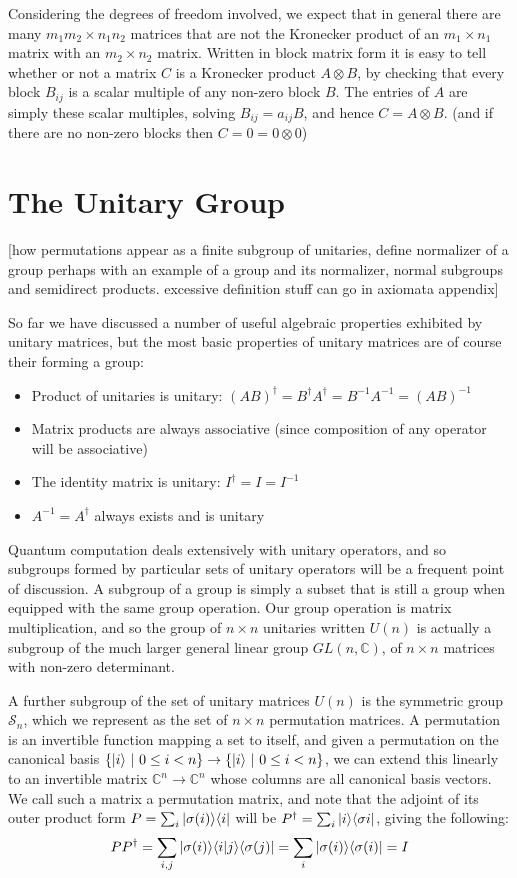 Considering the degrees of freedom involved, we expect that in general there are many $m_1m_2 \times n_1n_2$ matrices that are not the Kronecker product of an $m_1 \times n_1$ matrix with an $m_2 \times n_2$ matrix. Written in block matrix form it is easy to tell whether or not a matrix $C$ is a Kronecker product $A \otimes B$, by checking that every block $B_{ij}$ is a scalar multiple of any non-zero block $B$. The entries of $A$ are simply these scalar multiples, solving $B_{ij} = a_{ij}B$, and hence $C = A \otimes B$. (and if there are no non-zero blocks then $C = 0 = 0 \otimes 0$)
\section{The Unitary Group}
[how permutations appear as a finite subgroup of unitaries, define normalizer of a group perhaps with an example of a group and its normalizer, normal subgroups and semidirect products. excessive definition stuff can go in axiomata appendix]

So far we have discussed a number of useful algebraic properties exhibited by unitary matrices, but the most basic properties of unitary matrices are of course their forming a group:
\begin{itemize}
	\item Product of unitaries is unitary: ${(AB)}^\dagger = B^\dagger A^\dagger = B^{-1}A^{-1} = {(AB)}^{-1}$
	\item Matrix products are always associative (since composition of any operator will be associative)
	\item The identity matrix is unitary: $I^\dagger = I = I^{-1}$
	\item $A^{-1} = A^\dagger$ always exists and is unitary
\end{itemize}

Quantum computation deals extensively with unitary operators, and so subgroups formed by particular sets of unitary operators will be a frequent point of discussion. A subgroup of a group is simply a subset that is still a group when equipped with the same group operation. Our group operation is matrix multiplication, and so the group of $n \times n$ unitaries written $U(n)$ is actually a subgroup of the much larger general linear group $GL(n, \mathbb{C})$, of $n \times n$ matrices with non-zero determinant.

A further subgroup of the set of unitary matrices $U(n)$ is the symmetric group $\mathcal{S}_n$, which we represent as the set of $n \times n$ permutation matrices. A permutation is an invertible function mapping a set to itself, and given a permutation on the canonical basis $\{| i \rangle\ |\ 0 \leq i < n\} \to \{| i \rangle\ |\ 0 \leq i < n\}$, we can extend this linearly to an invertible matrix $\mathbb{C}^n \to \mathbb{C}^n$ whose columns are all canonical basis vectors. We call such a matrix a permutation matrix, and note that the adjoint of its outer product form $P = \sum_i | \sigma(i) \rangle\langle i |$ will be $P^{\dagger} = \sum_i | i \rangle\langle \sigma{i} |$, giving the following:
\begin{align*}
PP^\dagger = \sum_{i,j} | \sigma(i) \rangle\langle i | j \rangle\langle \sigma(j) | = \sum_i | \sigma(i) \rangle\langle \sigma(i) | = I
\end{align*}

